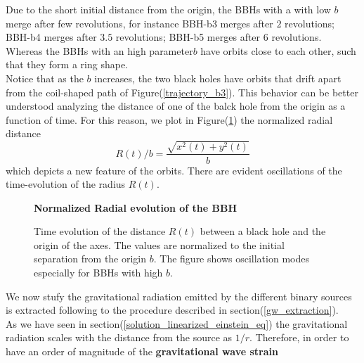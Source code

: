 Due to the short initial distance from the origin, the BBHs with a  with low $b$ merge after few revolutions, for instance BBH-b3 merges after $2$ revolutions; BBH-b4 merges after
$3.5$ revolutions; BBH-b5 merges after $6$ revolutions.
Whereas the BBHs with an high parameter$b$ have orbits close to each other, such that they form a ring shape.\\
Notice that as the $b$ increases, the two black holes have orbits that drift apart from the coil-shaped path of Figure(\ref{trajectory_b3}).
This behavior can be better understood analyzing the distance of one of the balck hole from the origin as a function of time. 
For this reason, we plot in Figure(\ref{radius_evolution}) the normalized radial distance
\[
R(t)/b = \frac{\sqrt{x ^{2} (t) + y^{2} (t)}}{b}
\]
which depicts a new feature of the orbits. There are evident oscillations of the time-evolution of the radius $R(t)$.
\begin{figure}
\centering
    \textbf{Normalized Radial evolution of the BBH}\par\medskip
{}
\caption{Time evolution of the distance $R(t)$ between a black hole and the origin of the axes. The values are normalized to the initial separation from the origin $b$. The figure shows oscillation modes especially for BBHs with high $b$.}
\label{radius_evolution}
\end{figure}
\par
We now stufy the gravitational radiation emitted by the different binary sources is extracted following to the procedure described in section(\ref{gw_extraction}).\\
As we have seen in section(\ref{solution_linearized_einstein_eq}) the gravitational radiation scales with the distance from the source as $1/r$.
Therefore, in order to have an order of magnitude of the \textbf{gravitational wave strain} 

